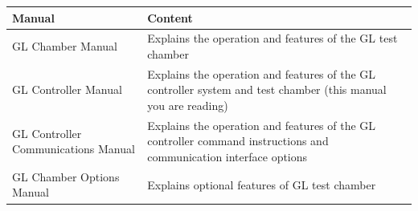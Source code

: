 \documentclass{article}
\begin{document}


\begin{longtable}[]{@{}|l|l|@{}}
\toprule
\rowcolor{magenta}\begin{minipage}[b]{0.28\columnwidth}\raggedright
{\bf{Manual}}\strut
\end{minipage} & \begin{minipage}[b]{0.66\columnwidth}\raggedright
{\bf{Content}}\strut
\end{minipage}\tabularnewline
\midrule
\endhead

\begin{minipage}[t]{0.28\columnwidth}\raggedright
GL Chamber Manual\strut
\end{minipage} & \begin{minipage}[t]{0.66\columnwidth}\raggedright
Explains the operation and features of the GL test chamber\strut
\end{minipage}\tabularnewline
\begin{minipage}[t]{0.28\columnwidth}\raggedright
GL Controller Manual\strut
\end{minipage} & \begin{minipage}[t]{0.66\columnwidth}\raggedright
Explains the operation and features of the GL controller system and test
chamber (this manual you are reading)\strut
\end{minipage}\tabularnewline
\begin{minipage}[t]{0.28\columnwidth}\raggedright
GL Controller Communications Manual\strut
\end{minipage} & \begin{minipage}[t]{0.66\columnwidth}\raggedright
Explains the operation and features of the GL controller command
instructions and communication interface options\strut
\end{minipage}\tabularnewline
\begin{minipage}[t]{0.28\columnwidth}\raggedright
GL Chamber Options Manual\strut
\end{minipage} & \begin{minipage}[t]{0.66\columnwidth}\raggedright
Explains optional features of GL test chamber\strut
\end{minipage}\tabularnewline
\bottomrule
\end{longtable}
\end{document}
